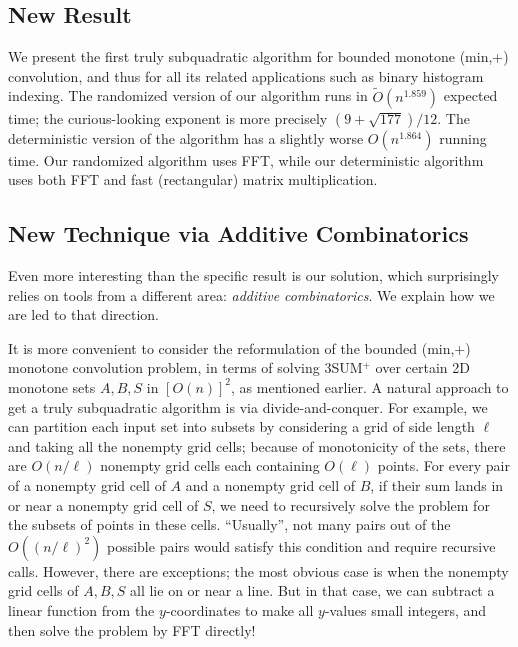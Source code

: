 \documentclass[11pt]{article}
\newcommand{\OO}{\widetilde{O}}
\begin{document}
\subsection{New Result}
We present the first truly subquadratic algorithm
for bounded monotone (min,+) convolution, and thus for
all its related applications such as binary histogram indexing.
The randomized version of our algorithm runs in
$\OO(n^{1.859})$ expected time; the curious-looking exponent is
more precisely $(9+\sqrt{177})/12$.
The deterministic version of the algorithm has a slightly worse
$O(n^{1.864})$ running time.  Our randomized algorithm uses FFT,
while
our deterministic algorithm uses both FFT and fast (rectangular) matrix multiplication.


\subsection{New Technique via Additive Combinatorics}

Even more interesting than the specific result
is our solution, which surprisingly relies on tools from a
different area: \emph{additive combinatorics}.  We explain
how we are led to that direction.

It is more convenient to consider the reformulation of
the bounded (min,+) monotone convolution problem, in terms
of solving 3SUM$^+$ over certain 2D monotone sets $A,B,S$
in $[O(n)]^2$, as mentioned earlier.
A natural approach to get a truly subquadratic algorithm
is via divide-and-conquer.  For example, we can
partition each input set into
subsets by considering a grid of side length $\ell$ and
taking all the nonempty grid cells;
because of monotonicity of the sets, there are $O(n/\ell)$ nonempty grid cells
each containing $O(\ell)$ points.
For every pair of a nonempty grid cell of $A$
and a nonempty grid cell of $B$, if their sum lands
in or near a nonempty grid cell of $S$, we need to
recursively solve the problem for the subsets of points in these
cells.  ``Usually'',
not many pairs out of the $O((n/\ell)^2)$ possible pairs would satisfy this condition and require recursive calls.
However, there are exceptions;
the most obvious case is when the nonempty grid cells of $A,B,S$ all lie on or near a line.
But in that case, we can subtract a linear function from
the $y$-coordinates to make all $y$-values small integers, and
then solve the problem by FFT directly!
\end{document}

